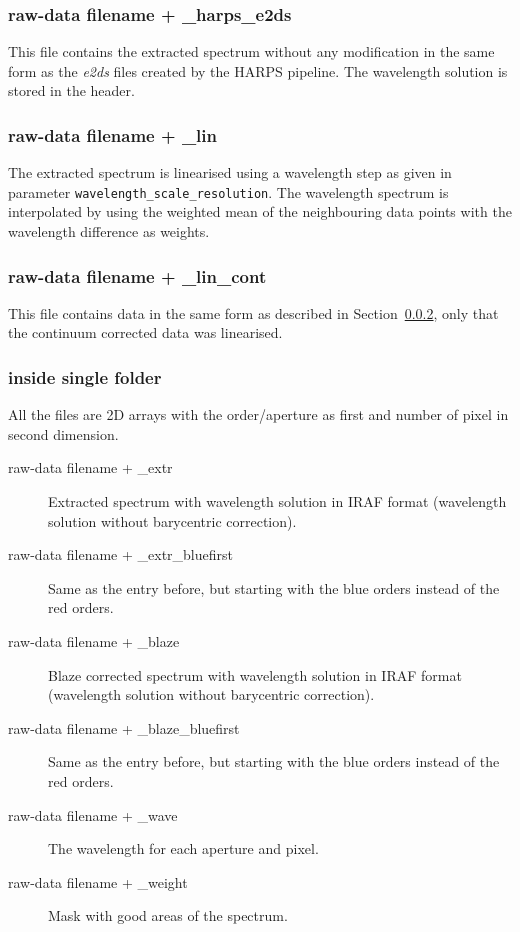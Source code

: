 \documentclass[10pt,a4paper]{article}
\begin{document}
\subsubsection{raw-data filename + \_harps\_e2ds}
This file contains the extracted spectrum without any modification in the same form as the \textit{e2ds} files created by the HARPS pipeline. The wavelength solution is stored in the header.

\subsubsection{raw-data filename + \_lin}
\label{Section:linearised_spectrum}
The extracted spectrum is linearised using a wavelength step as given in parameter \verb|wavelength_scale_resolution|. The wavelength spectrum is interpolated by using the weighted mean of the neighbouring data points with the wavelength difference as weights.

\subsubsection{raw-data filename + \_lin\_cont}
This file contains data in the same form as described in Section~\ref{Section:linearised_spectrum}, only that the continuum corrected data was linearised.

\subsubsection{inside single folder}
All the files are 2D arrays with the order/aperture as first and number of pixel in second dimension.
\begin{description}
 \item[raw-data filename + \_extr] Extracted spectrum with wavelength solution in IRAF format (wavelength solution without barycentric correction).
 \item[raw-data filename + \_extr\_bluefirst] Same as the entry before, but starting with the blue orders instead of the red orders.
 \item[raw-data filename + \_blaze] Blaze corrected spectrum with wavelength solution in IRAF format (wavelength solution without barycentric correction).
 \item[raw-data filename + \_blaze\_bluefirst] Same as the entry before, but starting with the blue orders instead of the red orders.
 \item[raw-data filename + \_wave] The wavelength for each aperture and pixel.
 \item[raw-data filename + \_weight] Mask with good areas of the spectrum.
\end{description}
\end{document}
